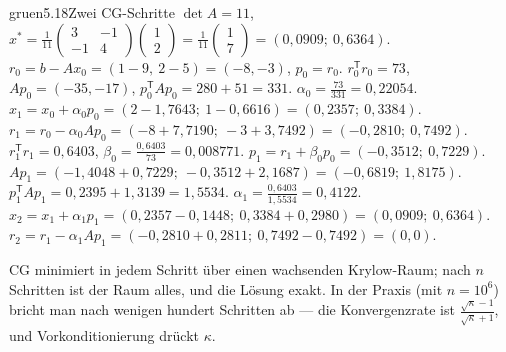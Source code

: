 \begin{loesungkarte}{gruen}{5.18}{Zwei CG-Schritte}
$\det A = 11$, $x^{*} = \frac1{11}\begin{pmatrix}3 & -1\\ -1 & 4\end{pmatrix}\begin{pmatrix}1\\ 2\end{pmatrix} = \frac1{11}\begin{pmatrix}1\\ 7\end{pmatrix} = (0{,}0909;\ 0{,}6364)$.
$r_0 = b - Ax_0 = (1 - 9,\ 2 - 5) = (-8, -3)$, $p_0 = r_0$. $r_0^{\mathsf T}r_0 = 73$, $Ap_0 = (-35, -17)$, $p_0^{\mathsf T}Ap_0 = 280 + 51 = 331$. $\alpha_0 = \frac{73}{331} = 0{,}22054$.
$x_1 = x_0 + \alpha_0p_0 = (2 - 1{,}7643;\ 1 - 0{,}6616) = (0{,}2357;\ 0{,}3384)$. $r_1 = r_0 - \alpha_0Ap_0 = (-8 + 7{,}7190;\ -3 + 3{,}7492) = (-0{,}2810;\ 0{,}7492)$. $r_1^{\mathsf T}r_1 = 0{,}6403$, $\beta_0 = \frac{0{,}6403}{73} = 0{,}008771$. $p_1 = r_1 + \beta_0p_0 = (-0{,}3512;\ 0{,}7229)$.
$Ap_1 = (-1{,}4048 + 0{,}7229;\ -0{,}3512 + 2{,}1687) = (-0{,}6819;\ 1{,}8175)$. $p_1^{\mathsf T}Ap_1 = 0{,}2395 + 1{,}3139 = 1{,}5534$. $\alpha_1 = \frac{0{,}6403}{1{,}5534} = 0{,}4122$. $x_2 = x_1 + \alpha_1p_1 = (0{,}2357 - 0{,}1448;\ 0{,}3384 + 0{,}2980) = (0{,}0909;\ 0{,}6364)$. $r_2 = r_1 - \alpha_1Ap_1 = (-0{,}2810 + 0{,}2811;\ 0{,}7492 - 0{,}7492) = (0, 0)$.
\begin{mitnehmen}\kastentext
CG minimiert in jedem Schritt über einen wachsenden Krylow-Raum; nach $n$ Schritten ist der Raum alles, und die Lösung exakt. In der Praxis (mit $n = 10^{6}$) bricht man nach wenigen hundert Schritten ab --- die Konvergenzrate ist $\frac{\sqrt\kappa - 1}{\sqrt\kappa + 1}$, und Vorkonditionierung drückt $\kappa$.
\end{mitnehmen}
\end{loesungkarte}

